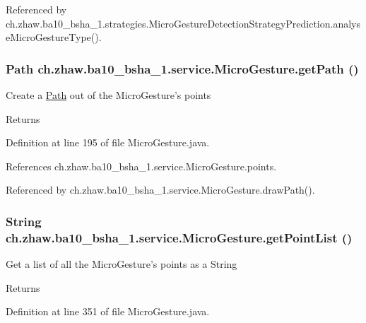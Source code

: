 Referenced by ch.zhaw.ba10\_\-bsha\_\-1.strategies.MicroGestureDetectionStrategyPrediction.analyseMicroGestureType().\hypertarget{classch_1_1zhaw_1_1ba10__bsha__1_1_1service_1_1MicroGesture_a9640a018716e9a2ff309360071af6be7}{
\subsubsection[{getPath}]{\setlength{\rightskip}{0pt plus 5cm}Path ch.zhaw.ba10\_\-bsha\_\-1.service.MicroGesture.getPath ()}}
\label{classch_1_1zhaw_1_1ba10__bsha__1_1_1service_1_1MicroGesture_a9640a018716e9a2ff309360071af6be7}
Create a \hyperlink{}{Path} out of the MicroGesture's points

\begin{DoxyReturn}{Returns}

\end{DoxyReturn}


Definition at line 195 of file MicroGesture.java.

References ch.zhaw.ba10\_\-bsha\_\-1.service.MicroGesture.points.

Referenced by ch.zhaw.ba10\_\-bsha\_\-1.service.MicroGesture.drawPath().\hypertarget{classch_1_1zhaw_1_1ba10__bsha__1_1_1service_1_1MicroGesture_a541771c10aeb3dcabe1d310a26ef1c2b}{
\subsubsection[{getPointList}]{\setlength{\rightskip}{0pt plus 5cm}String ch.zhaw.ba10\_\-bsha\_\-1.service.MicroGesture.getPointList ()}}
\label{classch_1_1zhaw_1_1ba10__bsha__1_1_1service_1_1MicroGesture_a541771c10aeb3dcabe1d310a26ef1c2b}
Get a list of all the MicroGesture's points as a String

\begin{DoxyReturn}{Returns}

\end{DoxyReturn}


Definition at line 351 of file MicroGesture.java.

